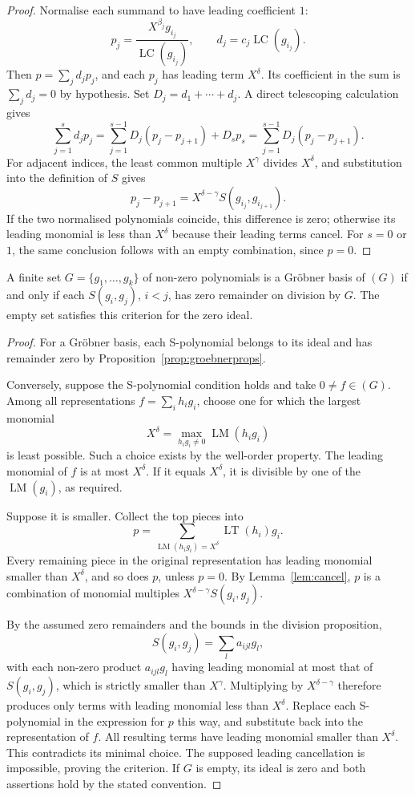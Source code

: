 \begin{proof}
Normalise each summand to have leading coefficient $1$:
\[
p_j=\frac{X^{\beta_j}g_{i_j}}{\operatorname{LC}(g_{i_j})},
\qquad d_j=c_j\operatorname{LC}(g_{i_j}).
\]
Then $p=\sum_jd_jp_j$, and each $p_j$ has leading term $X^\delta$. Its coefficient in the sum is $\sum_jd_j=0$ by hypothesis. Set $D_j=d_1+\cdots+d_j$. A direct telescoping calculation gives
\[
\sum_{j=1}^s d_jp_j
=\sum_{j=1}^{s-1}D_j(p_j-p_{j+1})+D_sp_s
=\sum_{j=1}^{s-1}D_j(p_j-p_{j+1}).
\]
For adjacent indices, the least common multiple $X^\gamma$ divides $X^\delta$, and substitution into the definition of $S$ gives
\[
p_j-p_{j+1}=X^{\delta-\gamma}S(g_{i_j},g_{i_{j+1}}).
\]
If the two normalised polynomials coincide, this difference is zero; otherwise its leading monomial is less than $X^\delta$ because their leading terms cancel. For $s=0$ or $1$, the same conclusion follows with an empty combination, since $p=0$.
\end{proof}

\begin{theorem}\label{thm:buchberger}
A finite set $G=\{g_1,\ldots,g_k\}$ of non-zero polynomials is a Gröbner basis of $(G)$ if and only if each $S(g_i,g_j)$, $i<j$, has zero remainder on division by $G$. The empty set satisfies this criterion for the zero ideal.
\end{theorem}

\begin{proof}
For a Gröbner basis, each S-polynomial belongs to its ideal and has remainder zero by Proposition~\ref{prop:groebnerprops}.

Conversely, suppose the S-polynomial condition holds and take $0\ne f\in(G)$. Among all representations $f=\sum_i h_ig_i$, choose one for which the largest monomial
\[
X^\delta=\max_{h_ig_i\ne0}\operatorname{LM}(h_ig_i)
\]
is least possible. Such a choice exists by the well-order property. The leading monomial of $f$ is at most $X^\delta$. If it equals $X^\delta$, it is divisible by one of the $\operatorname{LM}(g_i)$, as required.

Suppose it is smaller. Collect the top pieces into
\[
p=\sum_{\operatorname{LM}(h_ig_i)=X^\delta}\operatorname{LT}(h_i)g_i.
\]
Every remaining piece in the original representation has leading monomial smaller than $X^\delta$, and so does $p$, unless $p=0$. By Lemma~\ref{lem:cancel}, $p$ is a combination of monomial multiples $X^{\delta-\gamma}S(g_i,g_j)$.

By the assumed zero remainders and the bounds in the division proposition,
\[
S(g_i,g_j)=\sum_l a_{ijl}g_l,
\]
with each non-zero product $a_{ijl}g_l$ having leading monomial at most that of $S(g_i,g_j)$, which is strictly smaller than $X^\gamma$. Multiplying by $X^{\delta-\gamma}$ therefore produces only terms with leading monomial less than $X^\delta$. Replace each S-polynomial in the expression for $p$ this way, and substitute back into the representation of $f$. All resulting terms have leading monomial smaller than $X^\delta$. This contradicts its minimal choice. The supposed leading cancellation is impossible, proving the criterion. If $G$ is empty, its ideal is zero and both assertions hold by the stated convention.
\end{proof}

